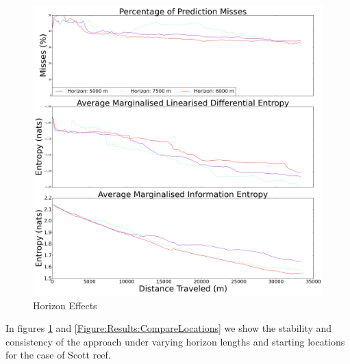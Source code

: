 \documentclass{article}
\begin{document}

		\begin{figure}[!htbp]
		\centering
			\includegraphics[width = \linewidth]{Figures/compare_horizons.png}
		\caption{Horizon Effects}
		\label{Figure:Results:CompareHorizons}
		\end{figure}
	
		In figures \ref{Figure:Results:CompareHorizons} and \ref{Figure:Results:CompareLocations} we show the stability and consistency of the approach under varying horizon lengths and starting locations for the case of Scott reef.
		
\end{document}

